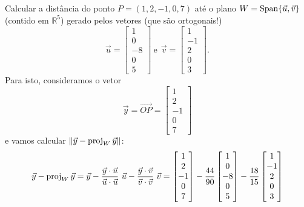 \documentclass[../livro.tex]{subfiles}  %
\begin{document}
\begin{example}
Calcular a distância do ponto $P = (1,2,-1,0,7)$ até o plano $W = \operatorname{Span}\{\vec{u}, \vec{v}\}$ (contido em $\mathbb{R}^5$) gerado pelos vetores (que são ortogonais!)
\begin{equation}
\vec{u} =
\begin{bmatrix}
1 \\ 0 \\ -8 \\ 0 \\ 5
\end{bmatrix} \ \text{e} \ \
\vec{v} = \begin{bmatrix}
1 \\ -1 \\ 2 \\ 0 \\ 3
\end{bmatrix}.
\end{equation} Para isto, consideramos o vetor
\begin{equation}
\vec{y} = \vec{OP} = \begin{bmatrix}
1 \\ 2 \\ -1 \\ 0 \\ 7
\end{bmatrix}
\end{equation}e vamos calcular $\|\vec{y} - \operatorname{proj}_W \vec{y}\|$:
  \begin{align*}
\vec{y} - \proj_W \vec{y} & = \vec{y} - \frac{\vec{y} \cdot \vec{u}}{\vec{u} \cdot \vec{u}} \ \vec{u} - \frac{\vec{y} \cdot \vec{v}}{\vec{v} \cdot \vec{v}} \ \vec{v}  =
\begin{bmatrix}
1 \\ 2 \\ -1 \\ 0 \\ 7
\end{bmatrix} - \frac{44}{90}
\begin{bmatrix}
1 \\ 0 \\ -8 \\ 0 \\ 5
\end{bmatrix} - \frac{18}{15}
\begin{bmatrix}
1 \\ -1 \\ 2 \\ 0 \\ 3
\end{bmatrix} \\

\end{align*}
\end{example}
\end{document}
